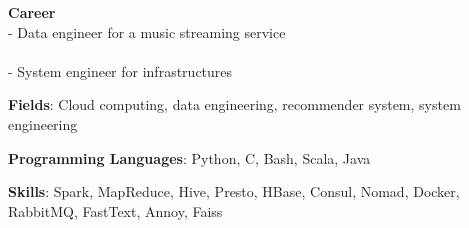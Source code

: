 

\begin{cventries}
    \cvsimpleentry
        { %
            \begin{cvitems}
                \item{
                    {\bf Career} \\
                    - Data engineer for a music streaming service \\
                     \\
                    - System engineer for infrastructures \\
                     \nn
                }
                \item{
                    {\bf Fields}: Cloud computing, data engineering, recommender system, system engineering \nn
                }
                \item{
                    {\bf Programming Languages}: Python, C, Bash, Scala, Java \nn
                }
                \item{
                    {\bf Skills}: Spark, MapReduce, Hive, Presto, HBase, Consul, Nomad, Docker, RabbitMQ, FastText, Annoy, Faiss\nn
                }
            \end{cvitems}
        }
\end{cventries}